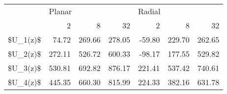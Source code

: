 \begin{tabular}{lrrrrrr}
\toprule
{} & \multicolumn{3}{l}{Planar} & \multicolumn{3}{l}{Radial} \\
{} &     2  &     8  &     32 &     2  &     8  &     32 \\
\midrule
\$U\_1(z)\$ &  74.72 & 269.66 & 278.05 & -59.80 & 229.70 & 262.65 \\
\$U\_2(z)\$ & 272.11 & 526.72 & 600.33 & -98.17 & 177.55 & 529.82 \\
\$U\_3(z)\$ & 530.81 & 692.82 & 876.17 & 221.41 & 537.42 & 740.61 \\
\$U\_4(z)\$ & 445.35 & 660.30 & 815.99 & 224.33 & 382.16 & 631.78 \\
\bottomrule
\end{tabular}
